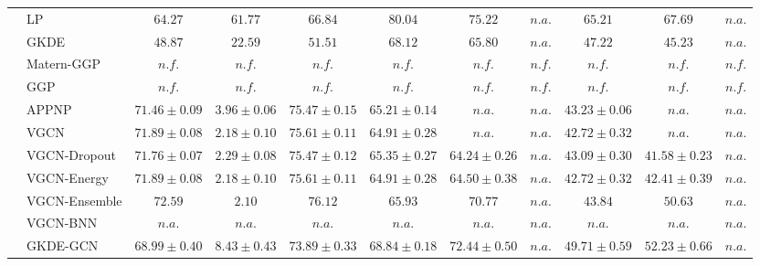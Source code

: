\begin{table*}[!h]
{\begin{tabular}{ll|cc|cccc|ccc}
        \midrule
        
        & LP & ${64.27}$ & ${61.77}$ & ${66.84}$ & ${\mathbf {80.04}}$ & ${{75.22}}$ & $n.a.$ & ${{65.21}}$ & ${\mathbf{67.69}}$ & $n.a.$\\
        & GKDE & ${48.87}$ & ${22.59}$ & ${51.51}$ & ${68.12}$ & ${65.80}$ & $n.a.$ & ${47.22}$ & ${45.23}$ & $n.a.$\\
        & Matern-GGP & $n.f.$ & $n.f.$ & $n.f.$ & $n.f.$ & $n.f.$ & $n.f.$ & $n.f.$ & $n.f.$ & $n.f.$\\
        & GGP & $n.f.$ & $n.f.$ & $n.f.$ & $n.f.$ & $n.f.$ & $n.f.$ & $n.f.$ & $n.f.$ & $n.f.$\\
        & APPNP & ${71.46\scriptscriptstyle \pm 0.09}$ & ${3.96\scriptscriptstyle \pm 0.06}$ & ${75.47\scriptscriptstyle \pm 0.15}$ & ${65.21\scriptscriptstyle \pm 0.14}$ & $n.a.$ & $n.a.$ & ${43.23\scriptscriptstyle \pm 0.06}$ & $n.a.$ & $n.a.$\\
        & VGCN & ${71.89\scriptscriptstyle \pm 0.08}$ & ${2.18\scriptscriptstyle \pm 0.10}$ & ${75.61\scriptscriptstyle \pm 0.11}$ & ${64.91\scriptscriptstyle \pm 0.28}$ & $n.a.$ & $n.a.$ & ${42.72\scriptscriptstyle \pm 0.32}$ & $n.a.$ & $n.a.$\\
        & VGCN-Dropout & ${71.76\scriptscriptstyle \pm 0.07}$ & ${2.29\scriptscriptstyle \pm 0.08}$ & ${75.47\scriptscriptstyle \pm 0.12}$ & ${65.35\scriptscriptstyle \pm 0.27}$ & ${64.24\scriptscriptstyle \pm 0.26}$ & $n.a.$ & ${43.09\scriptscriptstyle \pm 0.30}$ & ${41.58\scriptscriptstyle \pm 0.23}$ & $n.a.$\\
        & VGCN-Energy & ${71.89\scriptscriptstyle \pm 0.08}$ & ${2.18\scriptscriptstyle \pm 0.10}$ & ${75.61\scriptscriptstyle \pm 0.11}$ & ${64.91\scriptscriptstyle \pm 0.28}$ & ${64.50\scriptscriptstyle \pm 0.38}$ & $n.a.$ & ${42.72\scriptscriptstyle \pm 0.32}$ & ${42.41\scriptscriptstyle \pm 0.39}$ & $n.a.$\\
        & VGCN-Ensemble & ${\mathbf{72.59}}$ & ${\mathbf{2.10}}$ & ${\mathbf{76.12}}$ & ${65.93}$ & ${70.77}$ & $n.a.$ & ${43.84}$ & ${50.63}$ & $n.a.$\\
        & VGCN-BNN & $n.a.$ & $n.a.$ & $n.a.$ & $n.a.$ & $n.a.$ & $n.a.$ & $n.a.$ & $n.a.$ & $n.a.$\\
        & GKDE-GCN & ${68.99\scriptscriptstyle \pm 0.40}$ & ${8.43\scriptscriptstyle \pm 0.43}$ & ${73.89\scriptscriptstyle \pm 0.33}$ & ${68.84\scriptscriptstyle \pm 0.18}$ & ${72.44\scriptscriptstyle \pm 0.50}$ & $n.a.$ & ${49.71\scriptscriptstyle \pm 0.59}$ & ${52.23\scriptscriptstyle \pm 0.66}$ & $n.a.$\\

\end{tabular}}
\end{table*}
